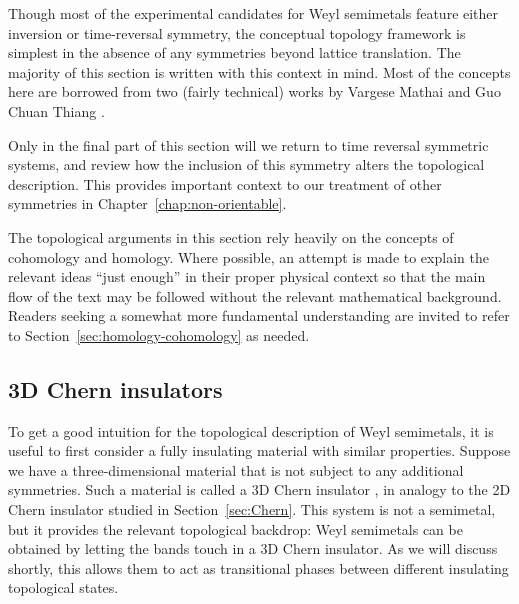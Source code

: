 Though most of the experimental candidates for Weyl semimetals feature either inversion or time-reversal symmetry, the conceptual topology framework is simplest in the absence of any symmetries beyond lattice translation. The majority of this section is written with this context in mind. Most of the concepts here are borrowed from two (fairly technical) works by Vargese Mathai and Guo Chuan Thiang \cite{Mathai_math-review,Mathai_math-paper}.

Only in the final part of this section will we return to time reversal symmetric systems, %
and review how the inclusion of this symmetry alters the topological description. This provides important context to our treatment of other symmetries in Chapter~\ref{chap:non-orientable}.

The topological arguments in this section rely heavily on the concepts of cohomology and homology. Where possible, an attempt is made to explain the relevant ideas ``just enough'' in their proper physical context so that the main flow of the text may be followed without the relevant mathematical background. Readers seeking a somewhat more fundamental understanding are invited to refer to Section~\ref{sec:homology-cohomology} as needed. %

\subsection{3D Chern insulators}

To get a good intuition for the topological description of Weyl semimetals, it is useful to first consider a fully insulating material with similar properties. Suppose we have a three-dimensional material that is not subject to any additional symmetries. Such a material is called a 3D Chern insulator \cite{Vanderbilt_2018,Liu_photonic-Chern-vector,Devescovi_3D-Chern}, in analogy to the 2D Chern insulator studied in Section~\ref{sec:Chern}. This system is not a semimetal, but it provides the relevant topological backdrop: Weyl semimetals can be obtained by letting the bands touch in a 3D Chern insulator. As we will discuss shortly, this allows them to act as transitional phases between different insulating topological states.

